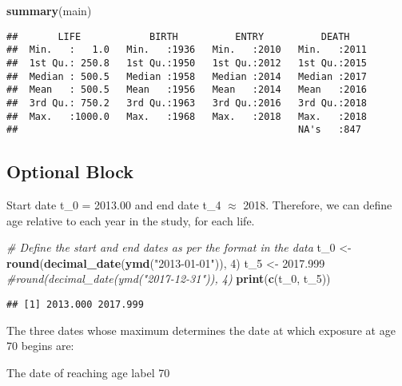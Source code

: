 \documentclass[
]{article}
\newenvironment{Shaded}{\begin{snugshade}}{\end{snugshade}}
\newcommand{\CommentTok}[1]{\textcolor[rgb]{0.56,0.35,0.01}{\textit{#1}}}
\newcommand{\DecValTok}[1]{\textcolor[rgb]{0.00,0.00,0.81}{#1}}
\newcommand{\FloatTok}[1]{\textcolor[rgb]{0.00,0.00,0.81}{#1}}
\newcommand{\FunctionTok}[1]{\textcolor[rgb]{0.13,0.29,0.53}{\textbf{#1}}}
\newcommand{\NormalTok}[1]{#1}
\newcommand{\OtherTok}[1]{\textcolor[rgb]{0.56,0.35,0.01}{#1}}
\newcommand{\StringTok}[1]{\textcolor[rgb]{0.31,0.60,0.02}{#1}}
\begin{document}
\begin{Shaded}
\begin{Highlighting}[]
\FunctionTok{summary}\NormalTok{(main)}
\end{Highlighting}
\end{Shaded}

\begin{verbatim}
##       LIFE            BIRTH          ENTRY          DEATH     
##  Min.   :   1.0   Min.   :1936   Min.   :2010   Min.   :2011  
##  1st Qu.: 250.8   1st Qu.:1950   1st Qu.:2012   1st Qu.:2015  
##  Median : 500.5   Median :1958   Median :2014   Median :2017  
##  Mean   : 500.5   Mean   :1956   Mean   :2014   Mean   :2016  
##  3rd Qu.: 750.2   3rd Qu.:1963   3rd Qu.:2016   3rd Qu.:2018  
##  Max.   :1000.0   Max.   :1968   Max.   :2018   Max.   :2018  
##                                                 NA's   :847
\end{verbatim}

\subsection{Optional Block}\label{optional-block}

Start date t\_0 = 2013.00 and end date t\_4 \(\approx\) 2018. Therefore,
we can define age relative to each year in the study, for each life.

\begin{Shaded}
\begin{Highlighting}[]
\CommentTok{\# Define the start and end dates as per the format in the data}
\NormalTok{t\_0 }\OtherTok{\textless{}{-}} \FunctionTok{round}\NormalTok{(}\FunctionTok{decimal\_date}\NormalTok{(}\FunctionTok{ymd}\NormalTok{(}\StringTok{"2013{-}01{-}01"}\NormalTok{)), }\DecValTok{4}\NormalTok{)}
\NormalTok{t\_5 }\OtherTok{\textless{}{-}} \FloatTok{2017.999} \CommentTok{\#round(decimal\_date(ymd("2017{-}12{-}31")), 4)}
\FunctionTok{print}\NormalTok{(}\FunctionTok{c}\NormalTok{(t\_0, t\_5))}
\end{Highlighting}
\end{Shaded}

\begin{verbatim}
## [1] 2013.000 2017.999
\end{verbatim}

The three dates whose maximum determines the date at which exposure at
age 70 begins are:

\item

The date of reaching age label 70
\end{document}

